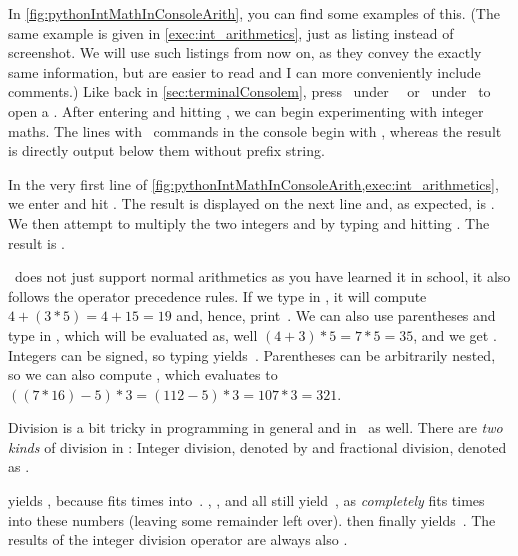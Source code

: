 In \cref{fig:pythonIntMathInConsoleArith}, you can find some examples of this.
(The same example is given in \cref{exec:int_arithmetics}, just as listing instead of screenshot.
We will use such listings from now on, as they convey the exactly same information, but are easier to read and I can more conveniently include comments.)
Like back in \cref{sec:terminalConsolem}, press \ubuntuTerminal\ under \ubuntu\ \linux\ or \windowsTerminal\ under \microsoftWindows\ to open a .
After entering  and hitting \keys{\return}, we can begin experimenting with integer maths.
The lines with \python\ commands in the console begin with \pythonil{>>>}, whereas the result is directly output below them without prefix string.

In the very first line of \cref{fig:pythonIntMathInConsoleArith,exec:int_arithmetics}, we enter \pythonIdx{+} and hit \keys{\return}.
The result is displayed on the next line and, as expected, is .
We then attempt to multiply the two integers  and  by typing  and hitting \keys{\return}.
The result is .

\python\ does not just support normal arithmetics as you have learned it in school, it also follows the operator precedence rules.
If we type in , it will compute $4+(3*5)=4+15=19$\pythonIdx{(}\pythonIdx{)} and, hence, print~.
We can also use parentheses and type in , which will be evaluated as, well $(4+3)*5=7*5=35$, and we get .
Integers can be signed, so typing \pythonIdx{-} yields~.
Parentheses can be arbitrarily nested, so we can also compute , which evaluates to $((7 * 16) - 5) * 3 = (112-5)*3=107*3=321$\pythonIdx{(}\pythonIdx{)}.

Division is a bit tricky in programming in general and in \python\ as well.
There are \emph{two kinds} of division in \python: Integer division, denoted by \pythonilIdx{//} and fractional division, denoted as \pythonilIdx{/}.

 yields , because  fits  times into~.
, , and  all still yield~, as  \emph{completely} fits  times into these numbers (leaving some remainder left over).
 then finally yields~.
The results of the integer division operator \pythonilIdx{//} are always also .

